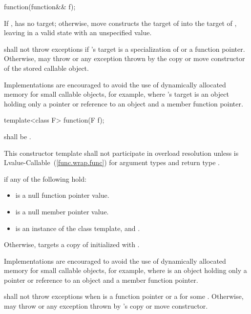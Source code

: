 %
\begin{itemdecl}
function(function&& f);
\end{itemdecl}

\begin{itemdescr}
\pnum
\effects If ,  has
no target; otherwise, move constructs the target of 
into the target of , leaving  in
a valid state with an unspecified value.

\pnum
\throws shall not throw exceptions if 's target is
a specialization of  or
a function pointer. Otherwise, may throw  or
any exception thrown by the copy or move constructor
of the stored callable object.
\begin{note} Implementations are encouraged to avoid the use of
dynamically allocated memory for small callable objects, for example,
where 's target is an object holding only a pointer or reference
to an object and a member function pointer. \end{note}
\end{itemdescr}

%
\begin{itemdecl}
template<class F> function(F f);
\end{itemdecl}

\begin{itemdescr}
\pnum
\requires {} shall be .

\pnum
\remarks This constructor template shall not participate in overload resolution unless
 is Lvalue-Callable~(\ref{func.wrap.func}) for argument types
 and return type .

\pnum
\postconditions {} if any of the following hold:
\begin{itemize}
\item {} is a null function pointer value.
\item {} is a null member pointer value.
\item {} is an instance of the  class template, and
  .
\end{itemize}

\pnum
Otherwise,  targets a copy of 
initialized with .
\begin{note} Implementations are encouraged to avoid the use of
dynamically allocated memory for small callable objects, for example,
where  is an object holding only a pointer or
reference to an object and a member function pointer. \end{note}

\pnum
\throws shall not throw exceptions when  is a function pointer
or a  for some . Otherwise,
may throw  or any exception thrown by 's copy
or move constructor.
\end{itemdescr}

